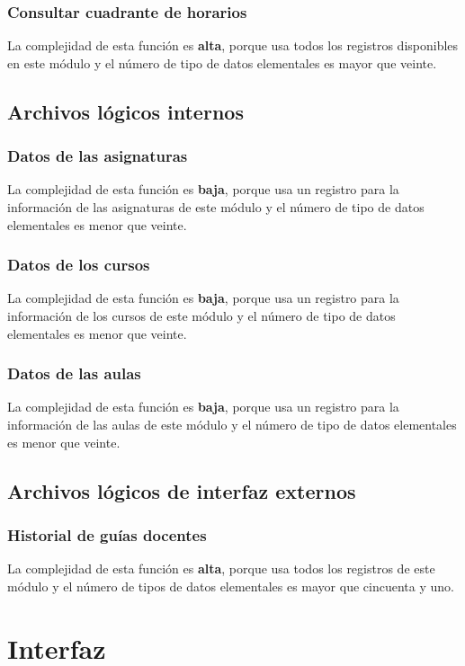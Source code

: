 \documentclass[11pt,a4paper,spanish,twoside]{book}
\begin{document}
\subsubsection{Consultar cuadrante de horarios}
La complejidad de esta función es \textbf{alta}, porque usa todos los
registros disponibles en este módulo y el número de tipo de datos elementales
es mayor que veinte.

\subsection{Archivos lógicos internos}
\subsubsection{Datos de las asignaturas}
La complejidad de esta función es \textbf{baja}, porque usa un
registro para la información de las asignaturas de este módulo y el número
de tipo de datos elementales es menor que veinte.

\subsubsection{Datos de los cursos}
La complejidad de esta función es \textbf{baja}, porque usa un
registro para la información de los cursos de este módulo y el número
de tipo de datos elementales es menor que veinte.

\subsubsection{Datos de las aulas}
La complejidad de esta función es \textbf{baja}, porque usa un
registro para la información de las aulas de este módulo y el número
de tipo de datos elementales es menor que veinte.

\subsection{Archivos lógicos de interfaz externos}
\subsubsection{Historial de guías docentes}
La complejidad de esta función es \textbf{alta}, porque usa todos los
registros de este módulo y el número de tipos de datos elementales es mayor
que cincuenta y uno. 

\section{Interfaz}
\end{document}
